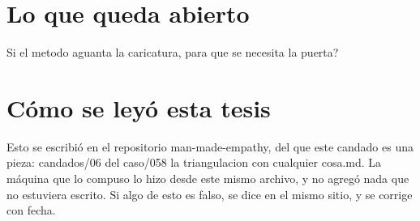 \documentclass[11pt,a4paper]{article}
\begin{document}
\section{Lo que queda abierto}
\textquestiondown{}Si el metodo aguanta la caricatura, para que se necesita la puerta?

\section*{Cómo se leyó esta tesis}
Esto se escribió en el repositorio man-made-empathy, del que este candado es una pieza: candados/06 del caso/058 la triangulacion con cualquier cosa.md. La máquina que lo compuso lo hizo desde este mismo archivo, y no agregó nada que no estuviera escrito. Si algo de esto es falso, se dice en el mismo sitio, y se corrige con fecha.
\end{document}
